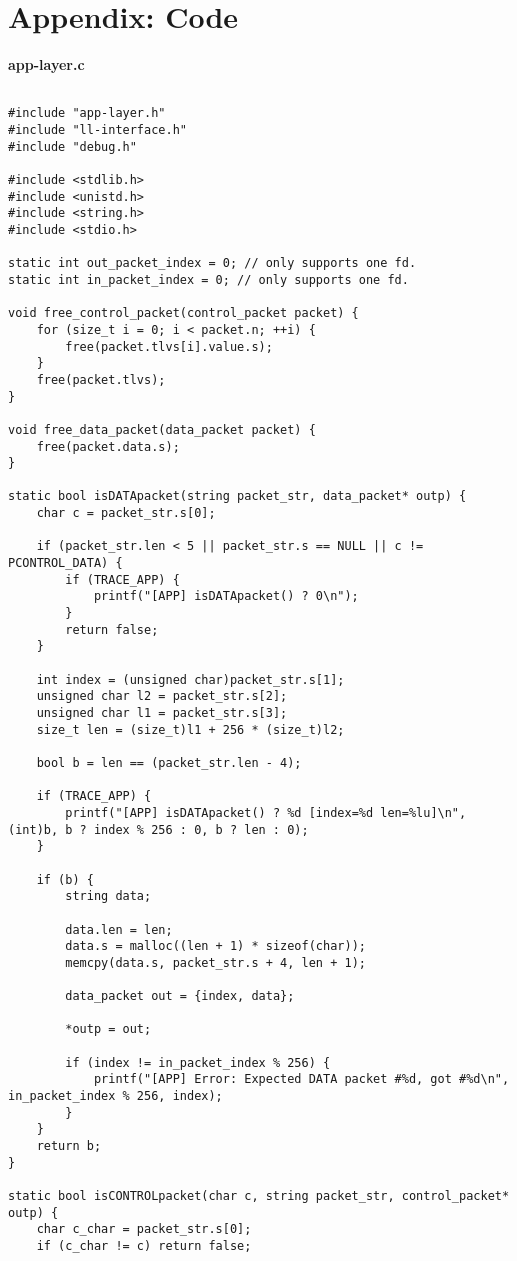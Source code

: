 \documentclass[subfiles]{main.tex}
\begin{document}
\section{Appendix: Code}

{\Large\textbf{app-layer.c}}

\begin{lstlisting}[style=rcom]
	
#include "app-layer.h"
#include "ll-interface.h"
#include "debug.h"

#include <stdlib.h>
#include <unistd.h>
#include <string.h>
#include <stdio.h>

static int out_packet_index = 0; // only supports one fd.
static int in_packet_index = 0; // only supports one fd.

void free_control_packet(control_packet packet) {
	for (size_t i = 0; i < packet.n; ++i) {
		free(packet.tlvs[i].value.s);
	}
	free(packet.tlvs);
}

void free_data_packet(data_packet packet) {
	free(packet.data.s);
}

static bool isDATApacket(string packet_str, data_packet* outp) {
	char c = packet_str.s[0];
	
	if (packet_str.len < 5 || packet_str.s == NULL || c != PCONTROL_DATA) {
		if (TRACE_APP) {
			printf("[APP] isDATApacket() ? 0\n");
		}
		return false;
	}
	
	int index = (unsigned char)packet_str.s[1];
	unsigned char l2 = packet_str.s[2];
	unsigned char l1 = packet_str.s[3];
	size_t len = (size_t)l1 + 256 * (size_t)l2;
	
	bool b = len == (packet_str.len - 4);
	
	if (TRACE_APP) {
		printf("[APP] isDATApacket() ? %d [index=%d len=%lu]\n", (int)b, b ? index % 256 : 0, b ? len : 0);
	}
	
	if (b) {
		string data;
		
		data.len = len;
		data.s = malloc((len + 1) * sizeof(char));
		memcpy(data.s, packet_str.s + 4, len + 1);
		
		data_packet out = {index, data};
		
		*outp = out;
		
		if (index != in_packet_index % 256) {
			printf("[APP] Error: Expected DATA packet #%d, got #%d\n", in_packet_index % 256, index);
		}
	}
	return b;
}

static bool isCONTROLpacket(char c, string packet_str, control_packet* outp) {
	char c_char = packet_str.s[0];
	if (c_char != c) return false;
	

\end{lstlisting}
\end{document}
